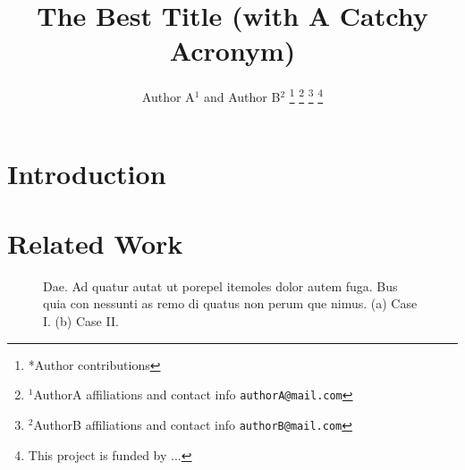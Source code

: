 \documentclass[letterpaper, 10 pt, conference, onecolumn]{IEEEtran}
\begin{document}
\title{\LARGE \bf The Best Title (with A Catchy Acronym)}
\author{Author A$^{1}$ and Author B$^{2}$
\thanks{*Author contributions}
\thanks{$^{1}$AuthorA affiliations and contact info
    {\tt\small authorA@mail.com}
    }
\thanks{$^{2}$AuthorB affiliations and contact info
    {\tt\small authorB@mail.com}
    }
\thanks{This project is funded by ...}
}
\maketitle

\begin{abstract}
\lipsum[1-3]
\end{abstract}


\section{Introduction}

\lipsum[1-3]



\section{Related Work}
\lipsum[1-3]

\begin{figure}[!t]
\centering
{}
\hfil
{}
\caption{Dae. Ad quatur autat ut porepel itemoles dolor autem fuga. Bus quia con nessunti as remo di quatus non perum que nimus. (a) Case I. (b) Case II.}
\label{fig_sim}
\end{figure}
\end{document}
